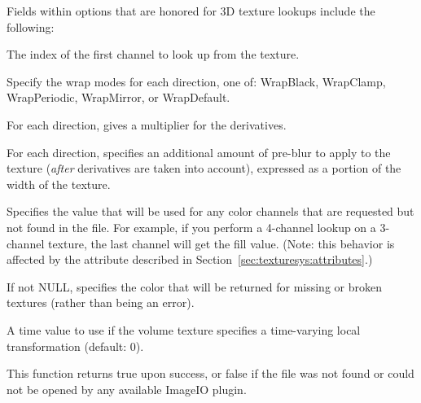 Fields within {\cf options} that are honored for 3D texture lookups
include the following:

\vspace{-12pt}
\vspace{10pt}
The index of the first channel to look up from the texture.
\apiend

\vspace{-24pt}
\vspace{10pt}
Specify the wrap modes for each direction, one of: 
{\cf WrapBlack}, {\cf WrapClamp}, {\cf WrapPeriodic}, {\cf WrapMirror},
or {\cf WrapDefault}.
\apiend

\vspace{-24pt}
\vspace{10pt}
For each direction, gives a multiplier for the derivatives.
\apiend

\vspace{-24pt}
\vspace{10pt}
For each direction, specifies an additional amount of pre-blur to apply
to the texture (\emph{after} derivatives are taken into account),
expressed as a portion of the width of the texture.
\apiend

\vspace{-24pt}
\vspace{10pt}
Specifies the value that will be used for any color channels that are
requested but not found in the file.  For example, if you perform a
4-channel lookup on a 3-channel texture, the last channel will
get the fill value.  (Note: this behavior is affected by the
 attribute described in 
Section~\ref{sec:texturesys:attributes}.)
\apiend

\vspace{-24pt}
\vspace{10pt}
If not NULL, specifies the color that will be returned for missing or
broken textures (rather than being an error).
\apiend

\vspace{-24pt}
\vspace{10pt}
A time value to use if the volume texture specifies a time-varying
local transformation (default: 0).
\apiend

This function returns {\cf true} upon success, or {\cf false} if the
file was not found or could not be opened by any available ImageIO
plugin.

